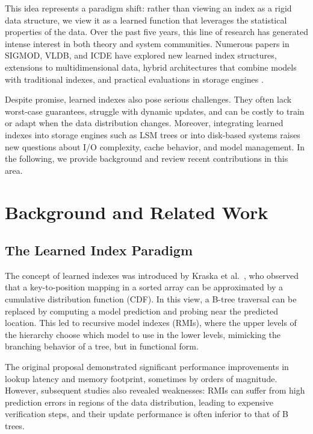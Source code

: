 \documentclass[sigconf]{acmart}
\begin{document}
This idea represents a paradigm shift: rather than viewing an index as
a rigid data structure, we view it as a learned function that
leverages the statistical properties of the data. Over the past five
years, this line of research has generated intense interest in both
theory and system communities. Numerous papers in SIGMOD, VLDB, and
ICDE have explored new learned index structures, extensions to
multidimensional data, hybrid architectures that combine models with
traditional indexes, and practical evaluations in storage engines
\cite{howgood2024,fidalgo2025learned,sato2024fast,sato2025cascaded,canlearned2024}.

Despite promise, learned indexes also pose serious challenges.
They often lack worst-case guarantees, struggle with dynamic updates,
and can be costly to train or adapt when the data distribution
changes. Moreover, integrating learned indexes into storage engines
such as LSM trees or into disk-based systems raises new questions about
I/O complexity, cache behavior, and model management. In the
following, we provide background and review recent contributions in
this area.

\section{Background and Related Work}

\subsection{The Learned Index Paradigm}

The concept of learned indexes was introduced by Kraska et
al.~\cite{kraska2018case}, who observed that a key-to-position mapping
in a sorted array can be approximated by a cumulative distribution
function (CDF). In this view, a B-tree traversal can be replaced by
computing a model prediction and probing near the predicted location.
This led to recursive model indexes (RMIs), where the upper levels of the
hierarchy choose which model to use in the lower levels, mimicking the
branching behavior of a tree, but in functional form.

The original proposal demonstrated significant performance
improvements in lookup latency and memory footprint, sometimes by
orders of magnitude. However, subsequent studies also revealed
weaknesses: RMIs can suffer from high prediction errors in regions of
the data distribution, leading to expensive verification steps, and
their update performance is often inferior to that of B trees.
\end{document}
